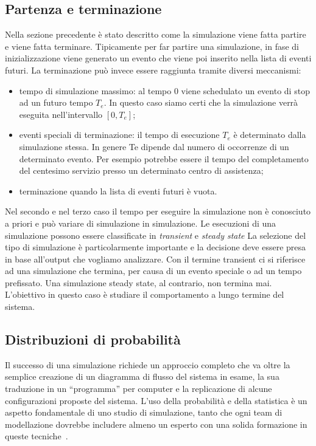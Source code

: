 \documentclass[12pt,a4paper,openright,twoside]{book}
\begin{document}
\subsection{Partenza e terminazione}
Nella sezione precedente è stato descritto come la simulazione viene fatta partire e viene fatta terminare. Tipicamente per far partire una simulazione, in fase di inizializzazione viene generato un evento che viene poi inserito nella lista di eventi futuri. 
La terminazione può invece essere raggiunta tramite diversi meccanismi: 
\begin{itemize}
    \item tempo di simulazione massimo: al tempo 0 viene schedulato un evento di stop ad un futuro tempo $T_e$. In questo caso siamo certi che la simulazione verrà eseguita nell'intervallo $[0, T_e]$; 
    \item eventi speciali di terminazione: il tempo di esecuzione $T_e$ è determinato dalla simulazione stessa. In genere Te dipende dal numero di occorrenze di un determinato evento. Per esempio potrebbe essere il tempo del completamento del centesimo servizio presso un determinato centro di assistenza;  
    \item terminazione quando la lista di eventi futuri è vuota.
\end{itemize}
Nel secondo e nel terzo caso il tempo per eseguire la simulazione non è conosciuto a priori e può variare di simulazione in simulazione.
Le esecuzioni di una simulazione possono essere classificate in \textit{transient} e \textit{steady state} La selezione del tipo di simulazione è particolarmente importante e la decisione deve essere presa in base all'output che vogliamo analizzare. Con il termine transient ci si riferisce ad una simulazione che termina, per causa di un evento speciale o ad un tempo prefissato. 
Una simulazione steady state, al contrario, non termina mai. L'obiettivo in questo caso è studiare il comportamento a lungo termine del sistema. 

\subsection{Distribuzioni di probabilità}
Il successo di una simulazione richiede un approccio completo che va oltre la semplice creazione di un diagramma di flusso del sistema in esame, la sua traduzione in un ``programma'' per computer e la replicazione di alcune configurazioni proposte del sistema. L'uso della probabilità e della statistica è un aspetto fondamentale di uno studio di simulazione, tanto che ogni team di modellazione dovrebbe includere almeno un esperto con una solida formazione in queste tecniche~\cite{Law15}.
\end{document}
